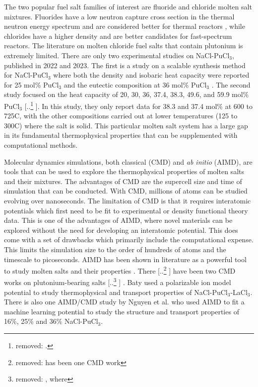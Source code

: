\documentclass[review]{elsarticle}
\providecommand{\DIFaddtex}[1]{{\protect\color{blue} \sf #1}} %
\providecommand{\DIFdeltex}[1]{{\protect\color{red} [..\footnote{removed: #1} ]}} %
\providecommand{\DIFaddbegin}{} %
\providecommand{\DIFaddend}{} %
\providecommand{\DIFdelbegin}{} %
\providecommand{\DIFdelend}{} %
\providecommand{\DIFadd}[1]{\texorpdfstring{\DIFaddtex{#1}}{#1}} %
\providecommand{\DIFdel}[1]{\texorpdfstring{\DIFdeltex{#1}}{}} %
\newcommand{\DIFscaledelfig}{0.5}
\newlength{\DIFdelgraphicswidth} %
\newlength{\DIFdelgraphicsheight} %
\newcommand{\DIFaddincludegraphics}[2][]{{\color{blue}\fbox{\DIFOincludegraphics[#1]{#2}}}} %
\newcommand{\DIFdelincludegraphics}[2][]{%
\sbox{\DIFdelgraphicsbox}{\DIFOincludegraphics[#1]{#2}}%
\settoboxwidth{\DIFdelgraphicswidth}{\DIFdelgraphicsbox} %
\settoboxtotalheight{\DIFdelgraphicsheight}{\DIFdelgraphicsbox} %
\scalebox{\DIFscaledelfig}{%
\parbox[b]{\DIFdelgraphicswidth}{\usebox{\DIFdelgraphicsbox}\\[-\baselineskip] \rule{\DIFdelgraphicswidth}{0em}}\llap{\resizebox{\DIFdelgraphicswidth}{\DIFdelgraphicsheight}{%
\setlength{\unitlength}{\DIFdelgraphicswidth}%
\begin{picture}(1,1)%
\thicklines\linethickness{2pt} %
{\color[rgb]{1,0,0}\put(0,0){\framebox(1,1){}}}%
{\color[rgb]{1,0,0}\put(0,0){\line( 1,1){1}}}%
{\color[rgb]{1,0,0}\put(0,1){\line(1,-1){1}}}%
\end{picture}%
}\hspace*{3pt}}} %
} %
\DeclareRobustCommand{\DIFaddbegin}{\DIFOaddbegin \let\includegraphics\DIFaddincludegraphics} %
\DeclareRobustCommand{\DIFaddend}{\DIFOaddend \let\includegraphics\DIFOincludegraphics} %
\DeclareRobustCommand{\DIFdelbegin}{\DIFOdelbegin \let\includegraphics\DIFdelincludegraphics} %
\DeclareRobustCommand{\DIFdelend}{\DIFOaddend \let\includegraphics\DIFOincludegraphics} %
\begin{document}
The two popular fuel salt families of interest are fluoride and chloride molten salt mixtures. Fluorides have a low neutron capture cross section in the thermal neutron energy spectrum and are considered better for thermal reactors \cite{williams2006assessment}, while chlorides have a higher density and are better candidates for fast-spectrum reactors. The literature on molten chloride fuel salts that contain plutonium is extremely limited. There are only two experimental studies on NaCl-PuCl$_3$, published in 2022 and 2023. The first is a study on a scalable synthesis method for NaCl-PuCl$_3$ where both the density and isobaric heat capacity were reported for 25 mol\% PuCl$_3$ and the eutectic composition at 36 mol\% PuCl$_3$ \cite{karlsson2022synthesis}. The second study focused on the heat capacity of 20, 30, 36, 37.4, 38.3, 49.6, and 59.9 mol\% PuCl$_3$ \DIFdelbegin \DIFdel{. }\DIFdelend \cite{lichtenstein2022property}. In this study, they only report data for 38.3 and 37.4 mol\% at 600 to 725\degree C, with the other compositions carried out at lower temperatures (125 to 300\degree C) where the salt is solid. This particular molten salt system has a large gap in its fundamental thermophysical properties that can be supplemented with computational methods.

Molecular dynamics simulations, both classical (CMD) and \textit{ab initio} (AIMD), are tools that can be used to explore the thermophysical properties of molten salts and their mixtures. The advantages of CMD are the supercell size and time of simulation that can be conducted. With CMD, millions of atoms can be studied evolving over nanoseconds. The limitation of CMD is that it requires interatomic potentials which first need to be fit to experimental or density functional theory data. This is one of the advantages of AIMD, where novel materials can be explored without the need for developing an interatomic potential. This does come with a set of drawbacks which primarily include the computational expense. This limits the simulation size to the order of hundreds of atoms and the timescale to picoseconds. AIMD has been shown in literature as a powerful tool to study molten salts and their properties \cite{Bengston2014, duemmler_liclkcl, duemmler_naclmgcl, Song2017}. There \DIFdelbegin \DIFdel{has been one CMD work }\DIFdelend \DIFaddbegin \DIFadd{have been two CMD works }\DIFaddend on plutonium-bearing salts\DIFdelbegin \DIFdel{, where }\DIFdelend \DIFaddbegin \DIFadd{. }\DIFaddend Baty \cite{baty2013molecular} used a polarizable ion model potential to study thermophysical and transport properties of NaCl-PuCl$_3$-LaCl$_3$. \DIFaddbegin \DIFadd{There is also one AIMD/CMD study by Nguyen et al. \cite{NGUYEN2023101951} who used AIMD to fit a machine learning potential to study the structure and transport properties of 16\%, 25\% and 36\% NaCl-PuCl$_3$.
}\DIFaddend 
\end{document}
